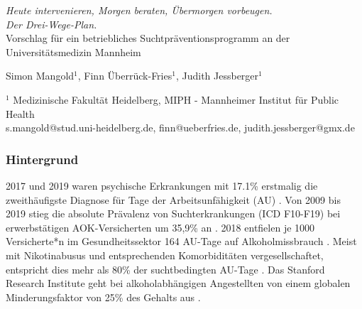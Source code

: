 \documentclass[a4paper]{article}
\begin{document}


\Large
 \begin{center}
   \textit{Heute intervenieren, Morgen beraten, Übermorgen vorbeugen. \\ Der Drei-Wege-Plan.} \\ Vorschlag für ein betriebliches Suchtpräventionsprogramm an der Universitätsmedizin Mannheim \\
\hspace{10pt}

\large
Simon Mangold$^1$, Finn Überrück-Fries$^1$, Judith Jessberger$^1$ \\

\hspace{10pt}

\small 
$^1$ Medizinische Fakultät Heidelberg, MIPH - Mannheimer Institut für Public Health\\
s.mangold@stud.uni-heidelberg.de, finn@ueberfries.de, judith.jessberger@gmx.de\\

\end{center}


\normalsize
\subsubsection*{Hintergrund}%
2017 und 2019 waren psychische Erkrankungen mit 17.1\% erstmalig die zweithäufigste Diagnose für Tage der Arbeitsunfähigkeit (AU) . Von 2009 bis 2019 stieg die absolute Prävalenz von Suchterkrankungen (ICD F10-F19) bei erwerbstätigen AOK-Versicherten um 35,9\% an . 2018 entfielen je 1000 Versicherte*n im Gesundheitssektor 164 AU-Tage auf Alkoholmissbrauch . Meist mit Nikotinabusus und entsprechenden Komorbiditäten vergesellschaftet, entspricht dies mehr als 80\% der suchtbedingten AU-Tage . Das Stanford Research Institute geht bei alkoholabhängigen Angestellten von einem globalen Minderungsfaktor von 25\% des Gehalts aus .



\end{document}
